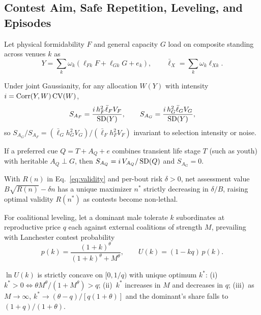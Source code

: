 \subsection{Contest Aim, Safe Repetition, Leveling, and Episodes}
Let physical formidability $F$ and general capacity $G$ load on composite standing across venues $k$ as
\begin{equation}
Y=\sum_k\omega_k(\ell_{Fk}F+\ell_{Gk}G+e_k),\qquad \bar\ell_X=\sum_k\omega_k\ell_{Xk}.\label{eq:venues}
\end{equation}

\begin{proposition}\label{prop:aim}
Under joint Gaussianity, for any allocation $W(Y)$ with intensity $i=\operatorname{Corr}(Y,W)\operatorname{CV}(W)$,
\begin{equation}
S_{A_F}=\frac{i\,h_F^2\bar\ell_FV_F}{\operatorname{SD}(Y)},\qquad S_{A_G}=\frac{i\,h_G^2\bar\ell_GV_G}{\operatorname{SD}(Y)},\label{eq:aim}
\end{equation}
so $S_{A_G}/S_{A_F}=(\bar\ell_Gh_G^2V_G)/(\bar\ell_Fh_F^2V_F)$ invariant to selection intensity or noise.
\end{proposition}

\begin{corollary}\label{cor:cue}
If a preferred cue $Q=T+A_Q+e$ combines transient life stage $T$ (such as youth) with heritable $A_Q\perp G$, then $S_{A_Q}=i\,V_{A_Q}/\operatorname{SD}(Q)$ and $S_{A_G}=0$.
\end{corollary}

\begin{proposition}\label{prop:repeat}
With $R(n)$ in Eq.~\eqref{eq:validity} and per-bout risk $\delta>0$, net assessment value $B\sqrt{R(n)}-\delta n$ has a unique maximizer $n^*$ strictly decreasing in $\delta/B$, raising optimal validity $R(n^*)$ as contests become non-lethal.
\end{proposition}

For coalitional leveling, let a dominant male tolerate $k$ subordinates at reproductive price $q$ each against external coalitions of strength $M$, prevailing with Lanchester contest probability
\begin{equation}
p(k)=\frac{(1+k)^\theta}{(1+k)^\theta+M^\theta},\qquad U(k)=(1-kq)\,p(k).\label{eq:csf}
\end{equation}

\begin{proposition}\label{prop:despot}
$\ln U(k)$ is strictly concave on $[0,1/q)$ with unique optimum $k^*$: (i)~$k^*>0\iff \theta M^\theta/(1+M^\theta)>q$; (ii)~$k^*$ increases in $M$ and decreases in $q$; (iii)~as $M\to\infty$, $k^*\to(\theta-q)/[q(1+\theta)]$ and the dominant's share falls to $(1+q)/(1+\theta)$.
\end{proposition}

